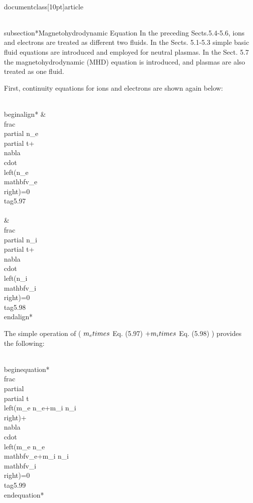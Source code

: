 \\documentclass[10pt]{article}
\begin{document}
{{{{\\subsection*{Magnetohydrodynamic Equation}
In the preceding Sects.5.4-5.6, ions and electrons are treated as different two fluids. In the Sects. 5.1-5.3 simple basic fluid equations are introduced and employed for neutral plasmas. In the Sect. 5.7 the magnetohydrodynamic (MHD) equation is introduced, and plasmas are also treated as one fluid.

First, continuity equations for ions and electrons are shown again below:


\\begin{align*}
& \\frac{\\partial n_{e}}{\\partial t}+\\nabla \\cdot\\left(n_{e} \\mathbf{v}_{e}\\right)=0  \\tag{5.97}\\\\
& \\frac{\\partial n_{i}}{\\partial t}+\\nabla \\cdot\\left(n_{i} \\mathbf{v}_{i}\\right)=0 \\tag{5.98}
\\end{align*}


The simple operation of ( $m_{e} \\times$ Eq. (5.97) $+m_{i} \\times$ Eq. (5.98) ) provides the following:


\\begin{equation*}
\\frac{\\partial}{\\partial t}\\left(m_{e} n_{e}+m_{i} n_{i}\\right)+\\nabla \\cdot\\left(m_{e} n_{e} \\mathbf{v}_{e}+m_{i} n_{i} \\mathbf{v}_{i}\\right)=0 \\tag{5.99}
\\end{equation*}


}}}}
\end{document}
